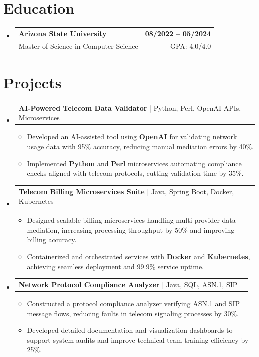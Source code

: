 \documentclass[letterpaper,11pt]{article}
\makeatletter
\newcommand{\resumeItem}[1]{
  \item\footnotesize{
    {#1 \vspace{-2pt}}
  }
}
\newcommand{\educationSubheading}[4]{
  \vspace{-2pt}\item
    \begin{tabular*}{1.0\textwidth}[t]{l@{\extracolsep{\fill}}r}
      \textbf{\small #1} & \textbf{\small #2} \\
      {\small#3} & {\small #4} \\
    \end{tabular*}\vspace{-7pt}
}
\newcommand{\resumeProjectHeading}[2]{
    \item
    \begin{tabular*}{1.001\textwidth}{l@{\extracolsep{\fill}}r}
      \small#1 & \textbf{\small #2}\\
    \end{tabular*}\vspace{-7pt}
}
\newcommand{\resumeSubHeadingListStart}{\begin{itemize}[leftmargin=0pt, label={}]}
\newcommand{\resumeSubHeadingListEnd}{\end{itemize}}
\newcommand{\resumeItemListStart}{\begin{itemize}[leftmargin=*]}
\newcommand{\resumeItemListEnd}{\end{itemize}\vspace{-5pt}}
\makeatother
\begin{document}
\section{Education}
  \resumeSubHeadingListStart
    \educationSubheading
      {Arizona State University}{08/2022 -- 05/2024}
      {Master of Science in Computer Science}{GPA: 4.0/4.0}
  \resumeSubHeadingListEnd

\section{Projects}
    \vspace{-5pt}
    \resumeSubHeadingListStart
          \resumeProjectHeading
              {\textbf{AI-Powered Telecom Data Validator} | Python, Perl, OpenAI APIs, Microservices}{}
        \resumeItemListStart
            \resumeItem{Developed an AI-assisted tool using \textbf{OpenAI} for validating network usage data with 95\% accuracy, reducing manual mediation errors by 40\%.}
            \resumeItem{Implemented \textbf{Python} and \textbf{Perl} microservices automating compliance checks aligned with telecom protocols, cutting validation time by 35\%.}
        \resumeItemListEnd
        \vspace{-12pt}
    
    \resumeProjectHeading
        {\textbf{Telecom Billing Microservices Suite} | Java, Spring Boot, Docker, Kubernetes}{}
        \resumeItemListStart
            \resumeItem{Designed scalable billing microservices handling multi-provider data mediation, increasing processing throughput by 50\% and improving billing accuracy.}
            \resumeItem{Containerized and orchestrated services with \textbf{Docker} and \textbf{Kubernetes}, achieving seamless deployment and 99.9\% service uptime.}
        \resumeItemListEnd
          \vspace{-12pt}
      \resumeProjectHeading
          {\textbf{Network Protocol Compliance Analyzer} | Java, SQL, ASN.1, SIP}{}
          \resumeItemListStart
              \resumeItem{Constructed a protocol compliance analyzer verifying ASN.1 and SIP message flows, reducing faults in telecom signaling processes by 30\%.}
              \resumeItem{Developed detailed documentation and visualization dashboards to support system audits and improve technical team training efficiency by 25\%.}
          \resumeItemListEnd 
    \resumeSubHeadingListEnd
\end{document}
